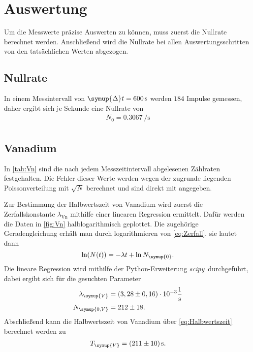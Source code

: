 \section{Auswertung}
\label{sec:Auswertung}

Um die Messwerte präzise Auswerten zu können, muss zuerst die Nullrate berechnet werden.
Anschließend wird die Nullrate bei allen Auswertungsschritten von den tatsächlichen Werten abgezogen.

\subsection{Nullrate}

In einem Messintervall von $\symup{\Delta}t=\qty{600}{\second}$ werden $184$ Impulse gemessen, daher
ergibt sich je Sekunde eine Nullrate von
\begin{gather*}
    N_0=\qty{0.3067}{\per\second} \\
\end{gather*}

\subsection{Vanadium}

In \autoref{tab:Vn} sind die nach jedem Messzeitintervall abgelesenen Zählraten festgehalten.
Die Fehler dieser Werte werden wegen der zugrunde liegenden Poissonverteilung mit $\sqrt{N}$ berechnet und sind
direkt mit angegeben.

Zur Bestimmung der Halbwertszeit von Vanadium wird zuerst die Zerfallskonstante $\lambda_\text{Vn}$ mithilfe einer linearen Regression
ermittelt.
Dafür werden die Daten in \autoref{fig:Vn} halblogarithmisch geplottet.
Die zugehörige Geradengleichung erhält man durch logarithmieren von \eqref{eq:Zerfall}, sie lautet dann
\begin{equation*}
  \ln(N(t)) = -\lambda t + \ln{N_{\symup{0}}}.
\end{equation*}
Die lineare Regression wird mithilfe der Python-Erweiterung \textit{scipy}\,\cite{scipy} durchgeführt, dabei
ergibt sich für die gesuchten Parameter
\begin{align*}
  \lambda_{\symup{V}} &= (3,28 \pm 0,16) \cdot 10^{-3} \unit{\per\second} \\
  N_{\symup{0, V}} &= 212 \pm 18.
\end{align*}
Abschließend kann die Halbwertszeit von Vanadium über \eqref{eq:Halbwertszeit} berechnet werden zu
\begin{gather*}
  T_{\symup{V}} = \qty{211+-10}{\second}.
\end{gather*}

